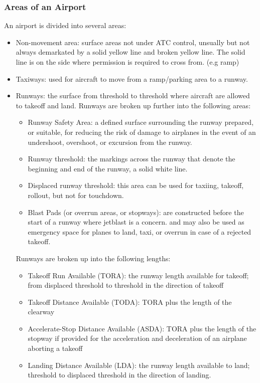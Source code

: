 \documentclass[12pt]{article}
\begin{document}
		\subsubsection{Areas of an Airport}
			An airport is divided into several areas:
			\begin{itemize}
				\item Non-movement area: surface areas not under ATC control, unsually but not always demarkated by a solid yellow line and broken yellow line. The solid line is on the side where permission is required to cross from. (e.g ramp)
				\item Taxiways: used for aircraft to move from a ramp/parking area to a runway.
				\item Runways: the surface from threshold to threshold where aircraft are allowed to takeoff and land. Runways are broken up further into the following areas:
				\begin{itemize}
					\item Runway Safety Area: a defined surface surrounding the runway prepared, or suitable, for reducing the risk of damage to airplanes in the event of an undershoot, overshoot, or excursion from the runway.
					\item Runway threshold: the markings across the runway that denote the beginning and end of the runway, a solid white line.
					\item Displaced runway threshold: this area can be used for taxiing, takeoff, rollout, but not for touchdown.
					\item Blast Pads (or overrun areas, or stopways): are constructed before the start of a runway where jetblast is a concern. and may also be used as emergency space for planes to land, taxi, or overrun in case of a rejected takeoff.
				\end{itemize}
				Runways are broken up into the following lengths:
				\begin{itemize}
					\item Takeoff Run Available (TORA): the runway length available for takeoff; from displaced threshold to threshold in the direction of takeoff
					\item Takeoff Distance Available (TODA): TORA plus the length of the clearway
					\item Accelerate-Stop Distance Available (ASDA): TORA plus the length of the stopway if provided for the acceleration and deceleration of an airplane aborting a takeoff
					\item Landing Distance Available (LDA): the runway length available to land; threshold to displaced threshold in the direction of landing.

\end{itemize}
\end{itemize}
\end{document}
